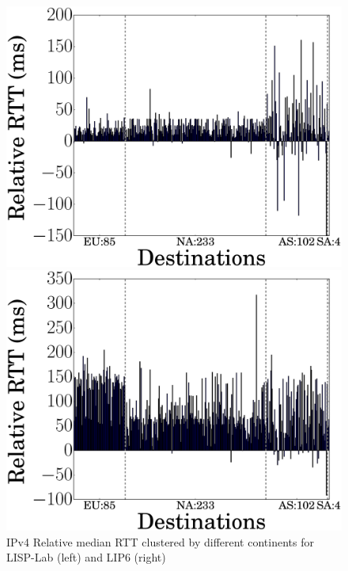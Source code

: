 \begin{figure}[!t]
	\begin{minipage}[c]{.49\linewidth}
		\begin{center}
			\includegraphics[width=\textwidth]{Pics/v4/Relative_median_avg(RTT)_LISP-Lab-FranceIX_changed_60.eps}
		\end{center}
	\end{minipage}
	\begin{minipage}[c]{.49\linewidth}
		\begin{center}
			\includegraphics[width=\textwidth]{Pics/v4/Relative_median_avg(RTT)_LIP6-FranceIX_changed_60.eps}
		\end{center}
	\end{minipage}
	\vspace{-0.5mm}
	\caption{IPv4 Relative median RTT clustered by different continents for LISP-Lab (left) and LIP6 (right)}
	\label{Relative_median_avg(RTT)_v4_2016}
\end{figure}
